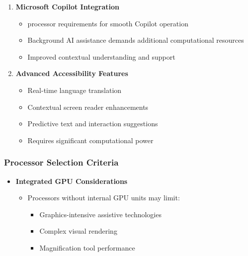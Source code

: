 \begin{enumerate}
	\item \textbf{Microsoft Copilot Integration}

	      \begin{itemize}
		      \item \gls{processor} requirements for smooth Copilot operation \supercite{MicrosoftCopilotRequirements}
		      \item Background AI assistance demands additional computational resources \supercite{MicrosoftCopilotTech}
		      \item Improved contextual understanding and support \supercite{MicrosoftCopilotFeatures}
	      \end{itemize}

	\item \textbf{Advanced Accessibility Features}

	      \begin{itemize}
		      \item Real-time language translation \supercite{GoogleTranslateRealtime}
		      \item Contextual screen reader enhancements \supercite{AIinAccessibility}
		      \item Predictive text and interaction suggestions \supercite{PredictiveTextAccessibility}
		      \item Requires significant computational power \supercite{AIComputationalRequirements}
	      \end{itemize}

\end{enumerate}



\subsubsection{Processor Selection Criteria}

\begin{itemize}
	\item \textbf{Integrated GPU Considerations}

	      \begin{itemize}
		      \item Processors without internal GPU units may limit:

		            \begin{itemize}
			            \item Graphics-intensive assistive technologies \supercite{GPUforAssistiveTech}
			            \item Complex visual rendering \supercite{GPUforAssistiveTech}
			            \item Magnification tool performance \supercite{GPUforAssistiveTech}
		            \end{itemize}

	      \end{itemize}

\end{itemize}


